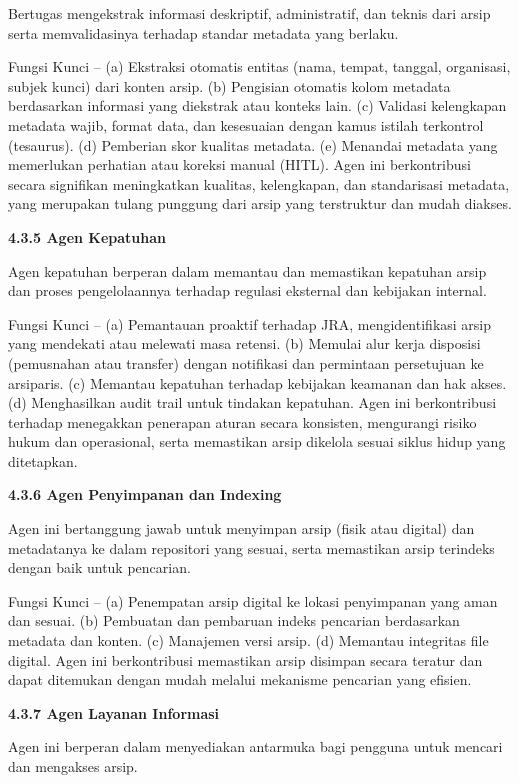 Bertugas mengekstrak informasi deskriptif, administratif, dan teknis
dari arsip serta memvalidasinya terhadap standar metadata yang berlaku.

Fungsi Kunci -- (a) Ekstraksi otomatis entitas (nama, tempat, tanggal,
organisasi, subjek kunci) dari konten arsip. (b) Pengisian otomatis
kolom metadata berdasarkan informasi yang diekstrak atau konteks lain.
(c) Validasi kelengkapan metadata wajib, format data, dan kesesuaian
dengan kamus istilah terkontrol (tesaurus). (d) Pemberian skor kualitas
metadata. (e) Menandai metadata yang memerlukan perhatian atau koreksi
manual (HITL). Agen ini berkontribusi secara signifikan meningkatkan
kualitas, kelengkapan, dan standarisasi metadata, yang merupakan tulang
punggung dari arsip yang terstruktur dan mudah diakses.

\textbf{4.3.5 Agen Kepatuhan}

Agen kepatuhan berperan dalam memantau dan memastikan kepatuhan arsip
dan proses pengelolaannya terhadap regulasi eksternal dan kebijakan
internal.

Fungsi Kunci -- (a) Pemantauan proaktif terhadap JRA, mengidentifikasi
arsip yang mendekati atau melewati masa retensi. (b) Memulai alur kerja
disposisi (pemusnahan atau transfer) dengan notifikasi dan permintaan
persetujuan ke arsiparis. (c) Memantau kepatuhan terhadap kebijakan
keamanan dan hak akses. (d) Menghasilkan audit trail untuk tindakan
kepatuhan. Agen ini berkontribusi terhadap menegakkan penerapan aturan
secara konsisten, mengurangi risiko hukum dan operasional, serta
memastikan arsip dikelola sesuai siklus hidup yang ditetapkan.

\textbf{4.3.6 Agen Penyimpanan dan Indexing}

Agen ini bertanggung jawab untuk menyimpan arsip (fisik atau digital)
dan metadatanya ke dalam repositori yang sesuai, serta memastikan arsip
terindeks dengan baik untuk pencarian.

Fungsi Kunci -- (a) Penempatan arsip digital ke lokasi penyimpanan yang
aman dan sesuai. (b) Pembuatan dan pembaruan indeks pencarian
berdasarkan metadata dan konten. (c) Manajemen versi arsip. (d) Memantau
integritas file digital. Agen ini berkontribusi memastikan arsip
disimpan secara teratur dan dapat ditemukan dengan mudah melalui
mekanisme pencarian yang efisien.

\textbf{4.3.7 Agen Layanan Informasi}

Agen ini berperan dalam menyediakan antarmuka bagi pengguna untuk
mencari dan mengakses arsip.

